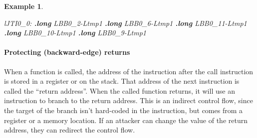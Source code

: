 \documentclass[
  a4paper,
]{report}
\newtheorem{example}{Example}
\newenvironment{Shaded}{}{}
\newcommand{\FunctionTok}[1]{\textcolor[rgb]{0.02,0.16,0.49}{#1}}
\newcommand{\KeywordTok}[1]{\textcolor[rgb]{0.00,0.44,0.13}{\textbf{#1}}}
\newcommand{\NormalTok}[1]{#1}
\newcommand{\OperatorTok}[1]{\textcolor[rgb]{0.40,0.40,0.40}{#1}}
\begin{document}
\begin{example}
\begin{Shaded}
\begin{Highlighting}[]
\FunctionTok{lJTI0\_0:}
  \KeywordTok{.long}\NormalTok{ LBB0\_2}\OperatorTok{{-}}\NormalTok{Ltmp1}
  \KeywordTok{.long}\NormalTok{ LBB0\_6}\OperatorTok{{-}}\NormalTok{Ltmp1}
  \KeywordTok{.long}\NormalTok{ LBB0\_11}\OperatorTok{{-}}\NormalTok{Ltmp1}
  \KeywordTok{.long}\NormalTok{ LBB0\_10}\OperatorTok{{-}}\NormalTok{Ltmp1}
  \KeywordTok{.long}\NormalTok{ LBB0\_9}\OperatorTok{{-}}\NormalTok{Ltmp1}
\end{Highlighting}
\end{Shaded}

\end{example}

\paragraph{Protecting (backward-edge)
returns}\label{protecting-backward-edge-returns}

When a function is called, the address of the instruction after the call
instruction is stored in a register or on the stack. That address of the
next instruction is called the
``\label{__index_entry_45}{return
address}''. When the called function returns, it
will use an instruction to branch to the return address. This is an
indirect control flow, since the target of the branch isn't hard-coded
in the instruction, but comes from a register or a memory location. If
an attacker can change the value of the return address, they can
redirect the control flow.
\end{document}
